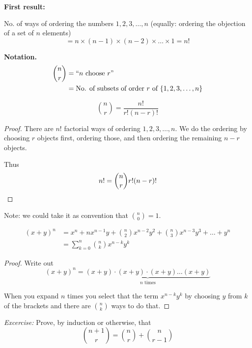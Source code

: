 \documentclass[10pt]{scrartcl}
\begin{document}
\textbf{First result:}

No. of ways of ordering the numbers $1,2,3,\dots,n$ (equally: ordering the objection of a set of $n$ elements) 
\[ = n \times (n-1) \times (n-2) \times \dots \times 1 = n!\]





\textbf{Notation.} 
\[
\begin{aligned}
\binom{n}{r} &= ``n \text{ choose } r"\\
  &= \mbox{No. of subsets of order $r$ of } \{1,2,3,\dots,n\}
\end{aligned}
\]

\begin{proposition}
\[\binom{n}{r}= \frac{n!}{r!(n-r)!}
\]	
\end{proposition}

\begin{proof}
There are $n!$ factorial ways of ordering $1,2,3,\dots, n$. We do the ordering by choosing $r$ objects first, ordering those, and then ordering the remaining $n-r$ objects. 

Thus
\[n! = \binom{n}{r} r! (n-r)! \qedhere\]
\end{proof}

Note: we could take it as convention that $\binom{n}{0} = 1
$. \\

\begin{proposition}
\[
\begin{aligned}
  (x + y)^n &= x^n + nx^{n-1}y + \binom{n}{2}x^{n-2}y^2 + \binom{n}{3}x^{n-3}y^3 + \dots + y^n\\
  &= \sum_{k=0}^{n} \binom{n}{k} x^{n-k}y^k
\end{aligned}
\]
\end{proposition}

\begin{proof}
Write out
\[(x+y)^n = \underbrace{(x+y) \cdot (x+y) \cdot(x+y) \dots (x+y)}_{n \text{ times}}\]	

When you expand $n$ times you select that the term $x^{n-k}y^k$ by choosing $y$  from $k$ of the brackets and there are $\binom{n}{k}$ ways to do that. 
\end{proof}

\emph{Excercise:} Prove, by induction or otherwise, that 
\[\binom{n+1}{r} = \binom{n}{r} + \binom{n}{r-1}\]
\vsp

\vspace*{8pt}
\end{document}
